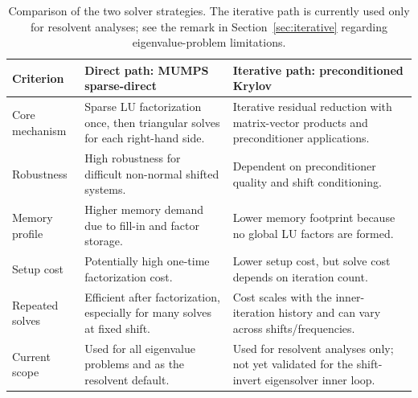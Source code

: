 \documentclass[11pt]{article}
\begin{document}
\begin{table}[t]
\centering
\small
\setlength{\tabcolsep}{5pt}
\begin{tabular}{L{2.8cm}L{4.4cm}L{4.4cm}}
\toprule
Criterion & Direct path: MUMPS sparse-direct & Iterative path: preconditioned Krylov \\
\midrule
Core mechanism & Sparse LU factorization once, then triangular solves for each right-hand side. & Iterative residual reduction with matrix-vector products and preconditioner applications. \\
Robustness & High robustness for difficult non-normal shifted systems. & Dependent on preconditioner quality and shift conditioning. \\
Memory profile & Higher memory demand due to fill-in and factor storage. & Lower memory footprint because no global LU factors are formed. \\
Setup cost & Potentially high one-time factorization cost. & Lower setup cost, but solve cost depends on iteration count. \\
Repeated solves & Efficient after factorization, especially for many solves at fixed shift. & Cost scales with the inner-iteration history and can vary across shifts/frequencies. \\
Current scope & Used for all eigenvalue problems and as the resolvent default. & Used for resolvent analyses only; not yet validated for the shift-invert eigensolver inner loop. \\
\bottomrule
\end{tabular}
\caption{Comparison of the two solver strategies. The iterative path is
currently used only for resolvent analyses; see the remark in
Section~\ref{sec:iterative} regarding eigenvalue-problem limitations.}
\label{tab:direct_iterative_compare}
\end{table}
\end{document}
